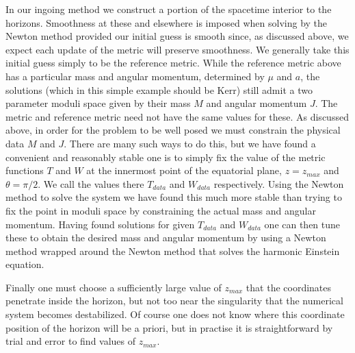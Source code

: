 \documentclass[12pt]{article}
\numberwithin{equation}{section}
\begin{document}
In our ingoing method we construct a portion of the spacetime interior to the horizons.
Smoothness at these and elsewhere is imposed when solving by the Newton method provided our initial guess is smooth since, as discussed above, we expect each update of the metric will preserve smoothness. We generally take this initial guess simply to be the reference metric.
%
While the reference metric above has a particular mass and angular momentum, determined by $\mu$ and $a$, the solutions (which in this simple example should be Kerr) still admit a two parameter moduli space given by their mass $M$ and angular momentum $J$. The metric and reference metric need not have the same values for these. As discussed above, in order for the problem to be well posed we must constrain the physical data $M$ and $J$. There are many such ways to do this, but we have found a convenient and reasonably stable one is to simply fix the value of the metric functions $T$ and $W$ at the innermost point of the equatorial plane, $z = z_{max}$ and $\theta = \pi/2$. 
We call the values there $T_{data}$ and $W_{data}$ respectively.
Using the Newton method to solve the system we have found this much more stable than trying to  fix the point in moduli space by constraining the actual mass and angular momentum. Having found solutions for given $T_{data}$ and $W_{data}$ one can then tune these to obtain the desired mass and angular momentum by using a Newton method wrapped around the Newton method that solves the harmonic Einstein equation.

Finally one must choose a sufficiently large value of $z_{max}$ that the coordinates penetrate inside the horizon, but not too near the singularity that the numerical system becomes destabilized. Of course one does not know where this coordinate position of the horizon will be a priori, but in practise it is straightforward by trial and error to find values of $z_{max}$.
\end{document}
